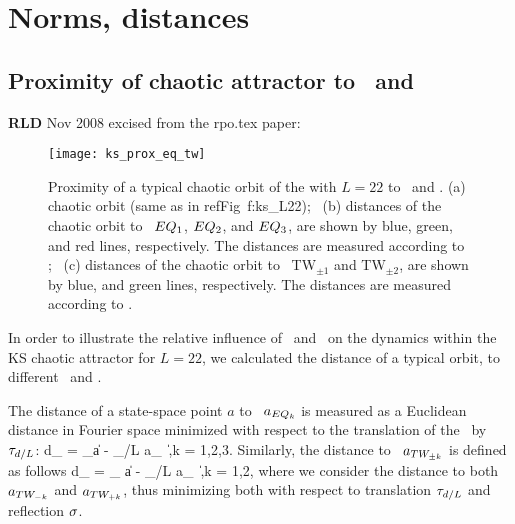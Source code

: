 \section{Norms, distances}
\label{sect:norms}

\subsection{Proximity of chaotic attractor to \eqva\ and \reqva}
\label{sec:proxeq}

{\bf RLD} Nov 2008  excised  from the rpo.tex paper:

\begin{figure}[t]
\begin{center}
\texttt{[image: ks\_prox\_eq\_tw]}
\end{center}
\caption{\color{blue}
Proximity of a typical chaotic orbit of the \KSe with $L =
22$ to \eqva\ and \reqva. (a) chaotic orbit (same as in
refFig~{f:ks\_L22}); ~(b) distances of the chaotic orbit to
\eqva\ $EQ_{1}$, $EQ_{2}$, and $EQ_{3}$, are shown by
blue, green, and red lines, respectively. The distances are
measured according to ; ~(c) distances of
the chaotic orbit to \reqva\ TW$_{\pm 1}$ and TW$_{\pm 2}$,
are shown by blue, and green lines, respectively. The
distances are measured according to .
     } \label{f:ks_prox_eq}
\end{figure}

In order to illustrate the relative influence of \eqva\ and \reqva\ on the dynamics
within the KS chaotic attractor for $L = 22$, we calculated the distance of a
typical orbit, to different \eqva\ and \reqva.

The distance of a state-space point $a$ to \eqv\ $a_{EQ_{k}}$ is measured as a
Euclidean distance in Fourier space minimized with respect to the translation
of the \eqv\ by $\tau_{d/L}$:
\beq
  d_{} = \min_\shift \|a - \Shift_{\shift/L} a_{} \|\,,\quad k = 1,2,3.
\label{eq:proxeq}
\eeq
Similarly, the distance to \reqv\ $a_{TW_{\pm k}}$ is defined as follows
\beq
  d_{} = \min_{\shift} \|a - \Shift_{\shift/L} a_{} \|\,,\quad k = 1,2,
\label{eq:proxtw}
\eeq
where we consider the distance to both $a_{TW_{-k}}$ and $a_{TW_{+k}}$, thus
minimizing both with respect to translation $\tau_{d/L}$ and reflection $\sigma$.

